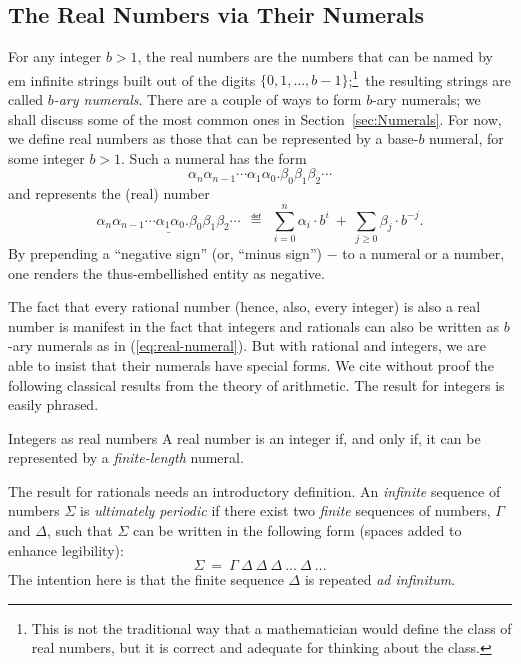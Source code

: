 \subsection{The Real Numbers via Their Numerals}

For any integer $b > 1$, the real numbers are the numbers that can be
named by {em infinite} strings built out of the digits $\{0, 1,
\ldots, b-1\}$;\footnote{This is not the traditional way that a
  mathematician would define the class of real numbers, but it is
  correct and adequate for thinking about the class.}~the resulting
strings are called {\em $b$-ary numerals}.  There are a couple of ways
to form $b$-ary numerals; we shall discuss some of the most common
ones in Section~\ref{sec:Numerals}.  For now, we define real numbers
as those that can be represented by a base-$b$ numeral, for some
integer $b >1$.  Such a numeral has the form
\begin{equation}
\label{eq:real-numeral}
\alpha_n \alpha_{n-1} \cdots \alpha_1 \alpha_0                  
. \beta_0 \beta_1 \beta_2 \cdots
\end{equation}
and represents the (real) number
\[
\underline{\alpha_n \alpha_{n-1} \cdots \alpha_1 \alpha_0                  
. \beta_0 \beta_1 \beta_2 \cdots}
\ \ \eqdef \ \
\sum_{i=0}^n \alpha_i \cdot b^i
\ + \ \sum_{j\geq 0} \beta_j \cdot b^{-j}.
\]
By prepending a ``negative sign'' (or, ``minus sign'') $-$ to a
numeral or a number, one renders the thus-embellished entity as
negative.

The fact that every rational number (hence, also, every integer) is
also a real number is manifest in the fact that integers and rationals
can also be written as $b$-ary numerals as in (\ref{eq:real-numeral}).
But with rational and integers, we are able to insist that their
numerals have special forms.  We cite without proof the following
classical results from the theory of arithmetic.  The result for
integers is easily phrased.

\begin{theorem}{Integers as real numbers}
\label{thm:integer-real}
A real number is an integer if, and only if, it can be represented by
a {\em finite-length} numeral.
\end{theorem}

The result for rationals needs an introductory definition.  An {\em
  infinite} sequence of numbers $\Sigma$ is {\em ultimately
  periodic} if there exist two
{\em finite} sequences of numbers, $\Gamma$ and $\Delta$, such that
$\Sigma$ can be written in the following form (spaces added to enhance
legibility):
\[ \Sigma \ = \ \Gamma \ \Delta \ \Delta \ \Delta \ \ldots 
\ \Delta \ \ldots
\]
The intention here is that the finite sequence $\Delta$ is repeated
{\it ad infinitum}.


